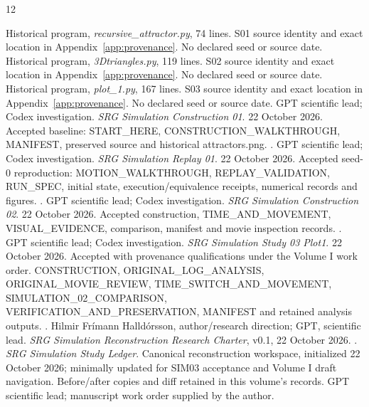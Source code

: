 \begin{thebibliography}{12}
\raggedright
{}
Historical program, \emph{recursive\_attractor.py}, 74 lines.
S01 source identity and exact location in Appendix~\ref{app:provenance}.
No declared seed or source date.
Historical program, \emph{3Dtriangles.py}, 119 lines.
S02 source identity and exact location in Appendix~\ref{app:provenance}.
No declared seed or source date.
Historical program, \emph{plot\_1.py}, 167 lines.
S03 source identity and exact location in Appendix~\ref{app:provenance}.
No declared seed or source date.
GPT scientific lead; Codex investigation.
\emph{SRG Simulation Construction 01}. 22 October 2026.
Accepted baseline: START\_HERE, CONSTRUCTION\_WALKTHROUGH,
MANIFEST, preserved source and historical attractors.png.
.
GPT scientific lead; Codex investigation.
\emph{SRG Simulation Replay 01}. 22 October 2026.
Accepted seed-0 reproduction: MOTION\_WALKTHROUGH,
REPLAY\_VALIDATION, RUN\_SPEC, initial state, execution/equivalence
receipts, numerical records and figures.
.
GPT scientific lead; Codex investigation.
\emph{SRG Simulation Construction 02}. 22 October 2026.
Accepted construction, TIME\_AND\_MOVEMENT, VISUAL\_EVIDENCE,
comparison, manifest and movie inspection records.
.
GPT scientific lead; Codex investigation.
\emph{SRG Simulation Study 03 Plot1}. 22 October 2026.
Accepted with provenance qualifications under the Volume I work order.
CONSTRUCTION, ORIGINAL\_LOG\_ANALYSIS, ORIGINAL\_MOVIE\_REVIEW,
TIME\_SWITCH\_AND\_MOVEMENT, SIMULATION\_02\_COMPARISON,
VERIFICATION\_AND\_PRESERVATION, MANIFEST and retained analysis outputs.
.
Hilmir Frímann Halldórsson, author/research direction;
GPT, scientific lead.
\emph{SRG Simulation Reconstruction Research Charter}, v0.1,
22 October 2026.
.
\emph{SRG Simulation Study Ledger}. Canonical reconstruction workspace,
initialized 22 October 2026; minimally updated for SIM03 acceptance and
Volume I draft navigation. Before/after copies and diff retained in
this volume's records.
GPT scientific lead; manuscript work order supplied by the author.

\end{thebibliography}
